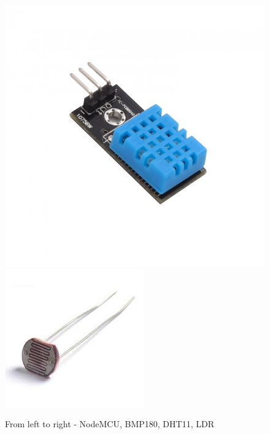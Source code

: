 \documentclass[12pt,a4paper]{article}
\begin{document}
\begin{figure}[!htb]
    \endminipage\hfill
    \centering
    \includegraphics[width=0.9\linewidth]{./images/dht11.jpg}
    \endminipage\hfill
    \centering
    \includegraphics[width=0.9\linewidth]{./images/ldr.jpeg}
    \endminipage
    \caption{From left to right - NodeMCU, BMP180, DHT11, LDR}
\end{figure}
\end{document}
